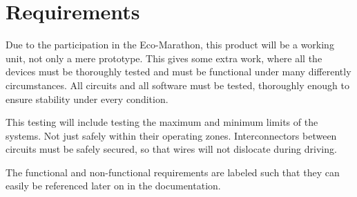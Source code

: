 \chapter{Requirements}
Due to the participation in the Eco-Marathon, this product will be a working unit, not only a mere prototype. This gives some extra work, where all the devices must be thoroughly tested and must be functional under many differently circumstances. All circuits and all software must be tested, thoroughly enough to ensure stability under every condition. 

This testing will include testing the maximum and minimum limits of the systems. Not just safely within their operating zones. 
Interconnectors between circuits must be safely secured, so that wires will not dislocate during driving.

The functional and non-functional requirements are labeled such that they can easily be referenced later on in the documentation.

%



